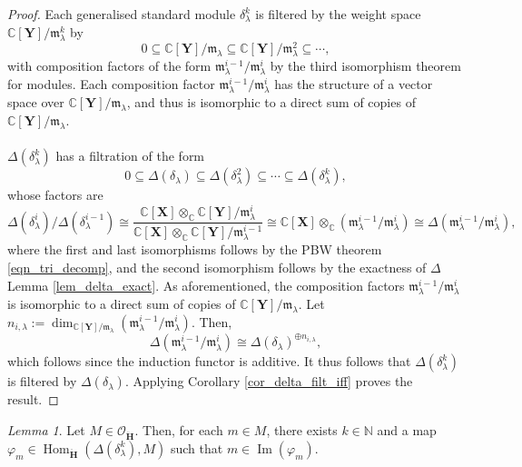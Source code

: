 \documentclass[a4paper]{report}
\theoremstyle{theorem}
\theoremstyle{definition}
\theoremstyle{remark}
\theoremstyle{proposition}
\theoremstyle{conjecture}
\theoremstyle{lemma}
\newtheorem{lemma}{Lemma}
\theoremstyle{corollary}
\theoremstyle{exercise}
\theoremstyle{example}
\newcommand{\C}{\mathbb{C}}
\newcommand{\mcal}{\mathcal}
\newcommand{\on}{\operatorname}
\begin{document}
  \begin{proof}
      Each generalised standard module $\delta_\lambda^k$ is filtered by 
      the weight space $\C[\mathbf{Y}]/\mathfrak{m}_\lambda^k$ by 
      $$0 \subseteq \C[\mathbf{Y}]/\mathfrak{m}_\lambda \subseteq \C[\mathbf{Y}]/\mathfrak{m}_\lambda^2 \subseteq \cdots,$$
      with composition factors of the form 
      $\mathfrak{m}_\lambda^{i-1}/\mathfrak{m}_\lambda^i$ by the third 
      isomorphism theorem for modules. Each composition factor 
      $\mathfrak{m}_\lambda^{i-1}/\mathfrak{m}_\lambda^i$ has the structure of a 
      vector space over $\C[\mathbf{Y}]/\mathfrak{m}_\lambda$, and thus 
      is isomorphic to a direct sum of copies of $\C[\mathbf{Y}]/\mathfrak{m}_\lambda$.\\\\
      $\Delta(\delta_\lambda^k)$ has a filtration of the form 
      $$0\subseteq \Delta(\delta_\lambda) \subseteq \Delta(\delta_\lambda^2) \subseteq \cdots \subseteq \Delta(\delta_\lambda^k),$$
      whose factors are $$\Delta(\delta_\lambda^i)/\Delta(\delta_\lambda^{i-1}) \cong \frac{\C[\mathbf{X}] \otimes_\C \C[\mathbf{Y}]/\mathfrak{m}_\lambda^i}{\C[\mathbf{X}] \otimes_\C \C[\mathbf{Y}]/\mathfrak{m}_\lambda^{i-1}} \cong \C[\mathbf{X}] \otimes_\C (\mathfrak{m}_\lambda^{i-1}/\mathfrak{m}_\lambda^i) \cong \Delta(\mathfrak{m}_\lambda^{i-1}/\mathfrak{m}_\lambda^i),$$
      where the first and last isomorphisms follows by the PBW theorem 
      \eqref{eqn_tri_decomp},
      and the second isomorphism follows by the exactness of $\Delta$ 
      Lemma \ref{lem_delta_exact}. As aforementioned, the composition factors 
      $\mathfrak{m}_\lambda^{i-1}/\mathfrak{m}_\lambda^i$ is isomorphic to a 
      direct sum of copies of $\C[\mathbf{Y}]/\mathfrak{m}_\lambda$.
      Let $n_{i,\lambda} := \dim_{\C[\mathbf{Y}]/\mathfrak{m}_\lambda}\left(\mathfrak{m}_\lambda^{i-1}/\mathfrak{m}_\lambda^i\right)$.
      Then,
      $$\Delta(\mathfrak{m}_\lambda^{i-1}/\mathfrak{m}_\lambda^i) \cong \Delta(\delta_\lambda)^{\oplus n_{i,\lambda}},$$
      which follows since the induction functor is additive.
      It thus follows that $\Delta(\delta_\lambda^k)$ is filtered by 
      $\Delta(\delta_\lambda)$. Applying Corollary \ref{cor_delta_filt_iff}
      proves the result.
  \end{proof}
  
  \begin{lemma}\label{lem_step2}
      Let $M \in \mcal{O}_{\mathbf{\ddot{\mathbf{H}}}}$. Then, for each $m\in M$, 
      there exists $k \in \mathbb{N}$ and a map 
      $\varphi_m \in \on{Hom}_{\mathbf{\ddot{\mathbf{H}}}}(\Delta(\delta_\lambda^k),M)$ 
      such that $m \in \on{Im}(\varphi_m)$.
  \end{lemma}
  
\end{document}
